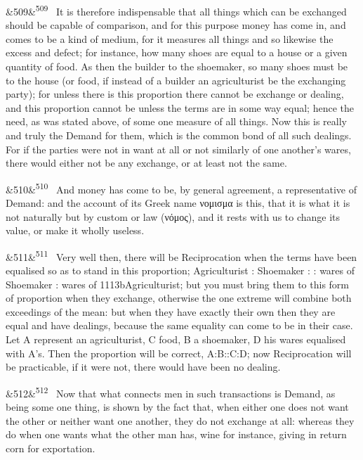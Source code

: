\documentclass[12pt]{article}
\newcommand{\para}[1][]{\par\noindent\ifx&#1&\else\textsuperscript{\footnotesize #1}~\fi}
\begin{document}
\para[509] It is therefore indispensable that all things which can be exchanged should be capable of comparison, and for this purpose money has come in, and comes to be a kind of medium, for it measures all things and so likewise the excess and defect; for instance, how many shoes are equal to a house or a given quantity of food. As then the builder to the shoemaker, so many shoes must be to the house (or food, if instead of a builder an agriculturist be the exchanging party); for unless there is this proportion there cannot be exchange or dealing, and this proportion cannot be unless the terms are in some way equal; hence the need, as was stated above, of some one measure of all things. Now this is really and truly the Demand for them, which is the common bond of all such dealings. For if the parties were not in want at all or not similarly of one another's wares, there would either not be any exchange, or at least not the same.

\para[510] And money has come to be, by general agreement, a representative of Demand: and the account of its Greek name νομισμα is this, that it is what it is not naturally but by custom or law (νόμος), and it rests with us to change its value, or make it wholly useless.

\para[511] Very well then, there will be Reciprocation when the terms have been equalised so as to stand in this proportion; Agriculturist : Shoemaker : : wares of Shoemaker : wares of 1113bAgriculturist; but you must bring them to this form of proportion when they exchange, otherwise the one extreme will combine both exceedings of the mean: but when they have exactly their own then they are equal and have dealings, because the same equality can come to be in their case. Let A represent an agriculturist, C food, B a shoemaker, D his wares equalised with A's. Then the proportion will be correct, A:B::C:D; now Reciprocation will be practicable, if it were not, there would have been no dealing.

\para[512] Now that what connects men in such transactions is Demand, as being some one thing, is shown by the fact that, when either one does not want the other or neither want one another, they do not exchange at all: whereas they do when one wants what the other man has, wine for instance, giving in return corn for exportation.
\end{document}
